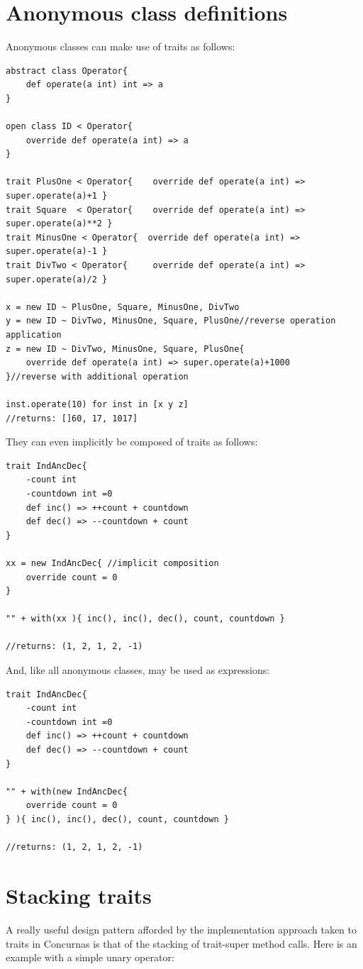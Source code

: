 \documentclass[conc-doc]{subfiles}
\begin{document}
\section{Anonymous class definitions}
Anonymous classes can make use of traits as follows:
\begin{lstlisting}
abstract class Operator{
	def operate(a int) int => a
}

open class ID < Operator{
	override def operate(a int) => a
}

trait PlusOne < Operator{    override def operate(a int) => super.operate(a)+1 }
trait Square  < Operator{    override def operate(a int) => super.operate(a)**2 }
trait MinusOne < Operator{  override def operate(a int) => super.operate(a)-1 }
trait DivTwo < Operator{     override def operate(a int) => super.operate(a)/2 }

x = new ID ~ PlusOne, Square, MinusOne, DivTwo 
y = new ID ~ DivTwo, MinusOne, Square, PlusOne//reverse operation application
z = new ID ~ DivTwo, MinusOne, Square, PlusOne{
	override def operate(a int) => super.operate(a)+1000
}//reverse with additional operation

inst.operate(10) for inst in [x y z]
//returns: []60, 17, 1017]
\end{lstlisting}

They can even implicitly be composed of traits as follows:
\begin{lstlisting}
trait IndAncDec{
	-count int
	-countdown int =0
	def inc() => ++count + countdown
	def dec() => --countdown + count
}

xx = new IndAncDec{ //implicit composition
	override count = 0
}

"" + with(xx ){ inc(), inc(), dec(), count, countdown }

//returns: (1, 2, 1, 2, -1)
\end{lstlisting}

And, like all anonymous classes, may be used as expressions:
\begin{lstlisting}
trait IndAncDec{
	-count int
	-countdown int =0
	def inc() => ++count + countdown
	def dec() => --countdown + count
}

"" + with(new IndAncDec{ 
	override count = 0
} ){ inc(), inc(), dec(), count, countdown }

//returns: (1, 2, 1, 2, -1)
\end{lstlisting}

\section{Stacking traits}
A really useful design pattern afforded by the implementation approach taken to traits in Concurnas is that of the stacking of trait-super method calls. Here is an example with a simple unary operator:
\end{document}
